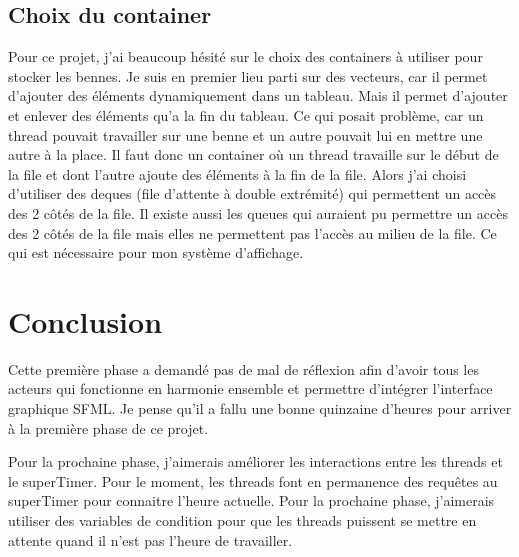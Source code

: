 \documentclass[a4paper, 12pt, oneside]{article}
\begin{document}
    \subsection{Choix du container}
    Pour ce projet, j'ai beaucoup hésité sur le choix des containers à utiliser pour stocker les bennes. Je suis en premier lieu parti sur des vecteurs, car il 
    permet d'ajouter des éléments dynamiquement dans un tableau. Mais il  permet d'ajouter et enlever des éléments qu’a la fin du tableau. Ce qui posait problème,
    car un thread pouvait travailler sur une benne et un autre pouvait lui en mettre une autre à la place. Il faut donc un container où un thread travaille sur le
    début de la file et dont l'autre ajoute des éléments à la fin de la file. Alors j'ai choisi d'utiliser des deques (file d'attente à double extrémité) qui 
    permettent un accès des 2 côtés de la file. Il existe aussi les queues qui auraient pu permettre un accès des 2 côtés de la file mais elles ne permettent pas l'accès
    au milieu de la file. Ce qui est nécessaire pour mon système d’affichage.
    
    \newpage
    \section{Conclusion}
    Cette première phase a demandé pas de mal de réflexion afin d'avoir tous les acteurs qui fonctionne en harmonie ensemble et permettre d'intégrer l'interface 
    graphique SFML. Je pense qu'il a fallu une bonne quinzaine d'heures pour arriver à la première phase de ce projet. 
    
    Pour la prochaine phase, j'aimerais améliorer les interactions entre les threads et le superTimer. Pour le moment, les threads font en permanence des requêtes au superTimer 
    pour connaitre l'heure actuelle. Pour la  prochaine phase, j'aimerais utiliser des variables de condition pour que les threads puissent se mettre en attente quand il n'est pas 
    l'heure de travailler.
\end{document}
